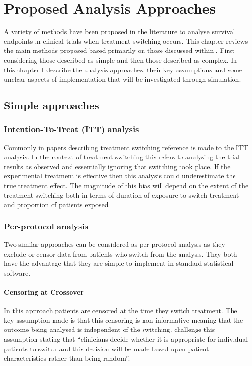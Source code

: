 \chapter{Proposed Analysis Approaches}
\label{CHAP:methods}

A variety of methods have been proposed in the literature to analyse survival endpoints in clinical trials when treatment switching occurs. This chapter reviews the main methods proposed based primarily on those discussed within \cite{TSD16}. First considering those described as simple and then those described as complex. In this chapter I describe the analysis approaches, their key assumptions and some unclear aspects of implementation that will be investigated through simulation.

\section{Simple approaches}

\subsection{Intention-To-Treat (ITT) analysis}
Commonly in papers describing treatment switching reference is made to the ITT analysis. In the context of treatment switching this refers to analysing the trial results as observed and essentially ignoring that switching took place. If the experimental treatment is effective then this analysis could underestimate the true treatment effect. The magnitude of this bias will depend on the extent of the treatment switching both in terms of duration of exposure to switch treatment and proportion of patients exposed. 

\subsection{Per-protocol analysis}
Two similar approaches can be considered as per-protocol analysis as they exclude or censor data from patients who switch from the analysis. They both have the advantage that they are simple to implement in standard statistical software.

\subsubsection{Censoring at Crossover}
In this approach patients are censored at the time they switch treatment. The key assumption made is that this censoring is non-informative meaning that the outcome being analysed is independent of the switching. \cite{TSD16} challenge this assumption stating that ``clinicians decide whether it is appropriate for individual patients to switch and this decision will be made based upon patient characteristics rather than being random''. 


